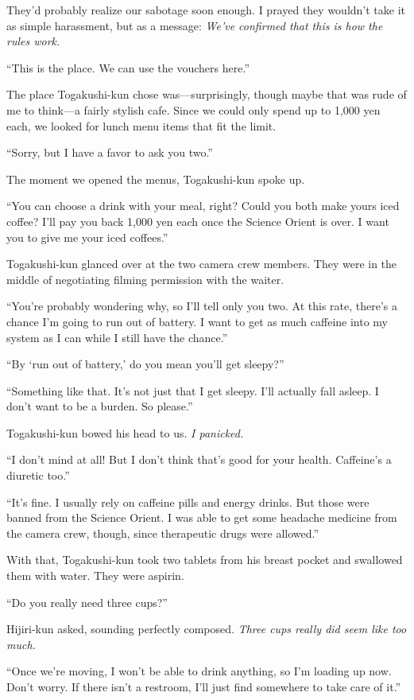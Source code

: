 \documentclass[
    a4paper,
    12pt,
    twoside,
    openany,
    UTF8,
    fontset=windows
]{ctexbook}
\begin{document}
They'd probably realize our sabotage soon enough. I prayed they wouldn't take it as simple harassment, but as a message: \textit{We've confirmed that this is how the rules work.}

``This is the place. We can use the vouchers here.''

The place Togakushi-kun chose was---surprisingly, though maybe that was rude of me to think---a fairly stylish cafe. Since we could only spend up to 1,000 yen each, we looked for lunch menu items that fit the limit.

``Sorry, but I have a favor to ask you two.''

The moment we opened the menus, Togakushi-kun spoke up.

``You can choose a drink with your meal, right? Could you both make yours iced coffee? I'll pay you back 1,000 yen each once the Science Orient is over. I want you to give me your iced coffees.''

Togakushi-kun glanced over at the two camera crew members. They were in the middle of negotiating filming permission with the waiter.

``You're probably wondering why, so I'll tell only you two. At this rate, there's a chance I'm going to run out of battery. I want to get as much caffeine into my system as I can while I still have the chance.''

``By `run out of battery,' do you mean you'll get sleepy?''

``Something like that. It's not just that I get sleepy. I'll actually fall asleep. I don't want to be a burden. So please.''

Togakushi-kun bowed his head to us. \textit{I panicked.}

``I don't mind at all! But I don't think that's good for your health. Caffeine's a diuretic too.''

``It's fine. I usually rely on caffeine pills and energy drinks. But those were banned from the Science Orient. I was able to get some headache medicine from the camera crew, though, since therapeutic drugs were allowed.''

With that, Togakushi-kun took two tablets from his breast pocket and swallowed them with water. They were aspirin.

``Do you really need three cups?''

Hijiri-kun asked, sounding perfectly composed. \textit{Three cups really did seem like too much.}

``Once we're moving, I won't be able to drink anything, so I'm loading up now. Don't worry. If there isn't a restroom, I'll just find somewhere to take care of it.''
\end{document}

